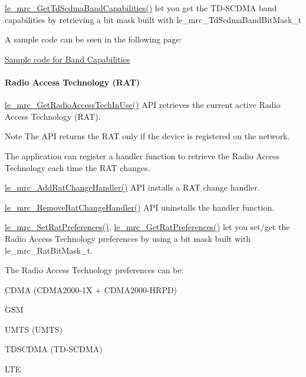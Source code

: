 \hyperlink{le__mrc__interface_8h_adfa81f2361744bc67697221845713a98}{le\+\_\+mrc\+\_\+\+Get\+Td\+Scdma\+Band\+Capabilities()} let you get the T\+D-\/\+S\+C\+D\+MA band capabilities by retrieving a bit mask built with {\ttfamily le\+\_\+mrc\+\_\+\+Td\+Scdma\+Band\+Bit\+Mask\+\_\+t} 

A sample code can be seen in the following page\+:
\begin{DoxyItemize}
\item \hyperlink{c_mrcBandCapabilities}{Sample code for Band Capabilities}
\end{DoxyItemize}\hypertarget{c_mrc_le_mrc_rat}{}\paragraph{Radio Access Technology (\+R\+A\+T)}\label{c_mrc_le_mrc_rat}
\hyperlink{le__mrc__interface_8h_a3ad9533c467cec0902d5d165bb32d67b}{le\+\_\+mrc\+\_\+\+Get\+Radio\+Access\+Tech\+In\+Use()} A\+PI retrieves the current active Radio Access Technology (R\+AT). \begin{DoxyNote}{Note}
The A\+PI returns the R\+AT only if the device is registered on the network.
\end{DoxyNote}
The application can register a handler function to retrieve the Radio Access Technology each time the R\+AT changes.

\hyperlink{le__mrc__interface_8h_aedd9c526588a8298322525cfba6f875d}{le\+\_\+mrc\+\_\+\+Add\+Rat\+Change\+Handler()} A\+PI installs a R\+AT change handler.

\hyperlink{le__mrc__interface_8h_a818abae622b5d2cb3cfec53b15f7023e}{le\+\_\+mrc\+\_\+\+Remove\+Rat\+Change\+Handler()} A\+PI uninstalls the handler function.

\hyperlink{le__mrc__interface_8h_a2d4abd391bc69c218538f5d8e1be4e01}{le\+\_\+mrc\+\_\+\+Set\+Rat\+Preferences()}, \hyperlink{le__mrc__interface_8h_ae9fa8655738c63e392c8dcc862bdb1d5}{le\+\_\+mrc\+\_\+\+Get\+Rat\+Preferences()} let you set/get the Radio Access Technology preferences by using a bit mask built with {\ttfamily le\+\_\+mrc\+\_\+\+Rat\+Bit\+Mask\+\_\+t}.

The Radio Access Technology preferences can be\+:
\begin{DoxyItemize}
\item C\+D\+MA (C\+D\+M\+A2000-\/1X + C\+D\+M\+A2000-\/\+H\+R\+PD)
\item G\+SM
\item U\+M\+TS (U\+M\+TS)
\item T\+D\+S\+C\+D\+MA (T\+D-\/\+S\+C\+D\+MA)
\item L\+TE
\end{DoxyItemize}

